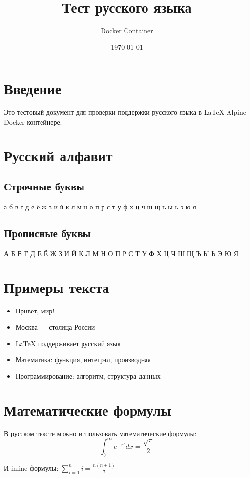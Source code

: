 \documentclass[12pt,a4paper]{article}
\title{Тест русского языка}
\author{Docker Container}
\date{\today}
\begin{document}
\maketitle

\section{Введение}
Это тестовый документ для проверки поддержки русского языка в LaTeX Alpine Docker контейнере.

\section{Русский алфавит}
\subsection{Строчные буквы}
а б в г д е ё ж з и й к л м н о п р с т у ф х ц ч ш щ ъ ы ь э ю я

\subsection{Прописные буквы}
А Б В Г Д Е Ё Ж З И Й К Л М Н О П Р С Т У Ф Х Ц Ч Ш Щ Ъ Ы Ь Э Ю Я

\section{Примеры текста}
\begin{itemize}
    \item Привет, мир!
    \item Москва — столица России
    \item LaTeX поддерживает русский язык
    \item Математика: функция, интеграл, производная
    \item Программирование: алгоритм, структура данных
\end{itemize}

\section{Математические формулы}
В русском тексте можно использовать математические формулы:
\begin{equation}
\int_{0}^{\infty} e^{-x^2} dx = \frac{\sqrt{\pi}}{2}
\end{equation}

И inline формулы: $\sum_{i=1}^{n} i = \frac{n(n+1)}{2}$
\end{document}
